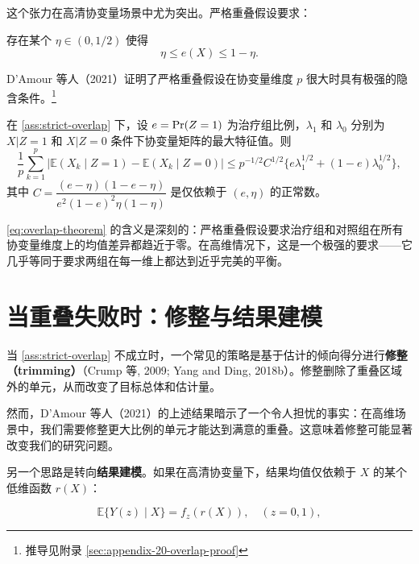 这个张力在高清协变量场景中尤为突出。严格重叠假设要求：

\begin{Assumption}[严格重叠]\label{ass:strict-overlap}
存在某个 $\eta \in (0, 1/2)$ 使得
\[
\eta \leq e(X) \leq 1 - \eta .
\]
\end{Assumption}

D'Amour 等人（2021）证明了严格重叠假设在协变量维度 $p$ 很大时具有极强的隐含条件。\footnote{推导见附录 \cref{sec:appendix-20-overlap-proof}}

\begin{Theorem}[D'Amour et al., 2021]\label{th:20-overlap-implication}
在 \cref{ass:strict-overlap} 下，设 $e = \operatorname{Pr}(Z=1)$ 为治疗组比例，$\lambda_1$ 和 $\lambda_0$ 分别为 $X|Z=1$ 和 $X|Z=0$ 条件下协变量矩阵的最大特征值。则
\begin{equation}
\frac{1}{p} \sum_{k=1}^{p} \bigl| \mathbb{E}(X_k \mid Z=1) - \mathbb{E}(X_k \mid Z=0) \bigr|
\leq p^{-1/2} C^{1/2} \bigl\{ e \lambda_1^{1/2} + (1-e) \lambda_0^{1/2} \bigr\},
\tag{20.2}
\label{eq:overlap-theorem}
\end{equation}
其中 $C = \dfrac{(e-\eta)(1-e-\eta)}{e^2(1-e)^2\eta(1-\eta)}$ 是仅依赖于 $(e,\eta)$ 的正常数。
\end{Theorem}

\cref{eq:overlap-theorem} 的含义是深刻的：严格重叠假设要求治疗组和对照组在所有协变量维度上的均值差异都趋近于零。在高维情况下，这是一个极强的要求——它几乎等同于要求两组在每一维上都达到近乎完美的平衡。

\section{当重叠失败时：修整与结果建模}\label{sec:20-when-overlap-fails}

当 \cref{ass:strict-overlap} 不成立时，一个常见的策略是基于估计的倾向得分进行\textbf{修整（trimming）}（Crump 等, 2009; Yang and Ding, 2018b）。修整删除了重叠区域外的单元，从而改变了目标总体和估计量。

然而，D'Amour 等人（2021）的上述结果暗示了一个令人担忧的事实：在高维场景中，我们需要修整更大比例的单元才能达到满意的重叠。这意味着修整可能显著改变我们的研究问题。

另一个思路是转向\textbf{结果建模}。如果在高清协变量下，结果均值仅依赖于 $X$ 的某个低维函数 $r(X)$：

\begin{equation}
\mathbb{E}\{Y(z) \mid X\} = f_z(r(X)), \quad (z=0,1),
\tag{20.3}
\label{eq:outcome-modeling}
\end{equation}

